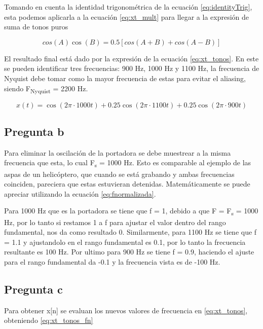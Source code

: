 \documentclass[conference]{IEEEtran}
\begin{document}
Tomando en cuenta la identidad trigonométrica de la ecuación \eqref{eq:identityTrig}, esta podemos aplicarla a la ecuación \eqref{eq:xt_mult} para llegar a la expresión de suma de tonos puros

\begin{equation}
cos(A)\cos(B)  = 0.5[cos(A+B)+cos(A-B)]
\label{eq:identityTrig}
\end{equation}

El resultado final está dado por la expresión de la ecuación \eqref{eq:xt_tonos}. 
En este se pueden identificar tres frecuencias: 900 Hz, 1000 Hz y 1100 Hz, la frecuencia de Nyquist debe tomar como la mayor frecuencia de estas para evitar el aliasing, siendo F\textsubscript{Nyquist} = 2200 Hz.

\begin{equation}
x(t) = \cos(2\pi \cdot 1000t) + 0.25\cos(2\pi \cdot 1100t) + 0.25\cos(2\pi \cdot 900t)
\label{eq:xt_tonos}
\end{equation}


\subsection{Pregunta b}

Para eliminar la oscilación de la portadora se debe muestrear a la misma frecuencia que esta, lo cual F\textsubscript{s} = 1000 Hz.
Esto es comparable al ejemplo de las aspas de un helicóptero, que cuando se está grabando y ambas frecuencias coinciden, pareciera que estas estuvieran detenidas. 
Matemáticamente se puede apreciar utilizando la ecuación \eqref{eq:fnormalizada}.


Para 1000 Hz que es la portadora se tiene que f = 1, debido a que F = F\textsubscript{s} = 1000 Hz, por lo tanto si restamos 1 a f para ajustar el valor dentro del rango fundamental, nos da como resultado 0.
Similarmente, para 1100 Hz se tiene que f = 1.1 y ajustandolo en el rango fundamental es 0.1, por lo tanto la frecuencia resultante es 100 Hz. 
Por ultimo para 900 Hz se tiene f = 0.9, haciendo el ajuste para el rango fundamental da -0.1 y la frecuencia vista es de -100 Hz.


\subsection{Pregunta c}

Para obtener x[n] se evaluan los nuevos valores de frecuencia en \eqref{eq:xt_tonos}, obteniendo \eqref{eq:xt_tonos_fn}
\end{document}
